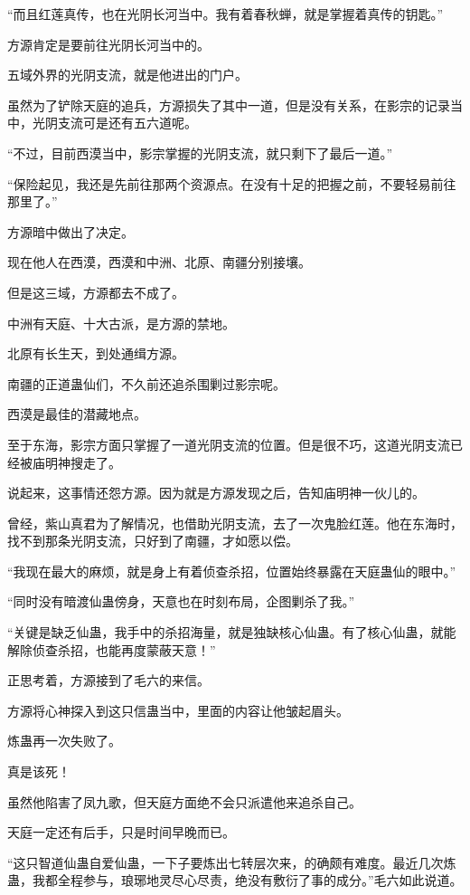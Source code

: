 \begin{this_body}
“而且红莲真传，也在光阴长河当中。我有着春秋蝉，就是掌握着真传的钥匙。”

方源肯定是要前往光阴长河当中的。

五域外界的光阴支流，就是他进出的门户。

虽然为了铲除天庭的追兵，方源损失了其中一道，但是没有关系，在影宗的记录当中，光阴支流可是还有五六道呢。

“不过，目前西漠当中，影宗掌握的光阴支流，就只剩下了最后一道。”

“保险起见，我还是先前往那两个资源点。在没有十足的把握之前，不要轻易前往那里了。”

方源暗中做出了决定。

现在他人在西漠，西漠和中洲、北原、南疆分别接壤。

但是这三域，方源都去不成了。

中洲有天庭、十大古派，是方源的禁地。

北原有长生天，到处通缉方源。

南疆的正道蛊仙们，不久前还追杀围剿过影宗呢。

西漠是最佳的潜藏地点。

至于东海，影宗方面只掌握了一道光阴支流的位置。但是很不巧，这道光阴支流已经被庙明神搜走了。

说起来，这事情还怨方源。因为就是方源发现之后，告知庙明神一伙儿的。

曾经，紫山真君为了解情况，也借助光阴支流，去了一次鬼脸红莲。他在东海时，找不到那条光阴支流，只好到了南疆，才如愿以偿。

“我现在最大的麻烦，就是身上有着侦查杀招，位置始终暴露在天庭蛊仙的眼中。”

“同时没有暗渡仙蛊傍身，天意也在时刻布局，企图剿杀了我。”

“关键是缺乏仙蛊，我手中的杀招海量，就是独缺核心仙蛊。有了核心仙蛊，就能解除侦查杀招，也能再度蒙蔽天意！”

正思考着，方源接到了毛六的来信。

方源将心神探入到这只信蛊当中，里面的内容让他皱起眉头。

炼蛊再一次失败了。

真是该死！

虽然他陷害了凤九歌，但天庭方面绝不会只派遣他来追杀自己。

天庭一定还有后手，只是时间早晚而已。

“这只智道仙蛊自爱仙蛊，一下子要炼出七转层次来，的确颇有难度。最近几次炼蛊，我都全程参与，琅琊地灵尽心尽责，绝没有敷衍了事的成分。”毛六如此说道。


\end{this_body}
